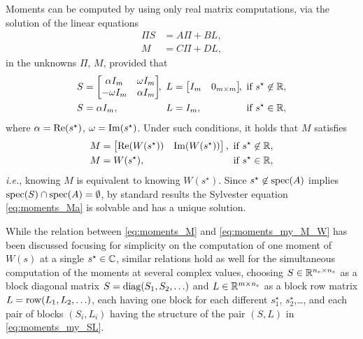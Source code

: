 Moments can be computed
by using only real matrix computations,
via the solution of the linear equations
\begin{subequations}\label{eq:moments_M}
	\begin{align}
		\Pi S & = A\Pi + BL, \label{eq:moments_Ma}  \\
		M     & = C \Pi + DL, \label{eq:moments_Mb}
	\end{align}
\end{subequations}
in the unknowns $\Pi$, $M$, provided that
\begin{subequations}\label{eq:moments_my_SL}
	\begin{align}
		S & =\bbm{\alpha I_m & \omega I_m                                                                                    \\ -\omega I_m  &\alpha I_m}\!\!,
		  & \!\!\!L          & =\bbm{I_m   & 0_{m\times m}}\!\!, & \!\!\!\text{if
		}s^{\star}\not\in\R,\label{eq:moments_my_SLa}                                                                       \\
		S & =\alpha I_m ,    & \!\!\!\!\!L & =I_m,               & \!\!\!\text{if }s^{\star}\in\R,\label{eq:moments_my_SLb}
	\end{align}
\end{subequations}
where $\alpha=\operatorname{Re}(s^{\star})$, $\omega=\operatorname{Im}(s^{\star})$.
Under such conditions, it holds that $M$ satisfies
\begin{subequations}\label{eq:moments_my_M_W}
	\begin{align}
		M & =\begin{bmatrix}\operatorname{Re}(W(s^{\star}))                               & \operatorname{Im}(W(s^{\star}))\end{bmatrix},
		  & \!\!\!\text{if }s^{\star}\not\in\mathbb{R},\label{eq:moments_my_M_Wa}                                                              \\
		M & =W(s^{\star}),                                        & \!\!\!\text{if }s^{\star}\in\mathbb{R},\label{eq:moments_my_M_Wb}
	\end{align}
\end{subequations}
\emph{i.e.}, knowing $M$ is equivalent to knowing $W(s^{\star})$.
Since $s^{\star}\not\in\operatorname{spec}(A)$ implies
$\operatorname{spec}(S)\cap\operatorname{spec}(A)=\emptyset$,
by standard results \cite[Lemma 2.7]{zhou_robust_1996}
the Sylvester equation \eqref{eq:moments_Ma}
is solvable and has a unique solution.

\begin{remark}\label{rem:M_extension}
	While the relation between \eqref{eq:moments_M} and \eqref{eq:moments_my_M_W}
	has been discussed focusing for simplicity on the computation
	of one moment of $W(s)$ at a single
	$s^\star\in\mathbb{C}$,
	similar relations hold as well for the simultaneous computation
	of the moments at several complex values,
	choosing $S\in\mathbb{R}^{n_e\times n_e}$ as a block diagonal matrix
	$S=\operatorname{diag}(S_1,S_2,\ldots)$
	and $L\in\mathbb{R}^{m\times n_e}$ as a block row matrix
	$L=\operatorname{row}(L_1,L_2,\ldots)$,
	each having one block for each different $s^\star_1$,
	$s^\star_2$,\ldots,
	and each pair of blocks $(S_i,L_i)$
	having the structure of the pair $(S,L)$ in \eqref{eq:moments_my_SL}.\closeremark
\end{remark}

